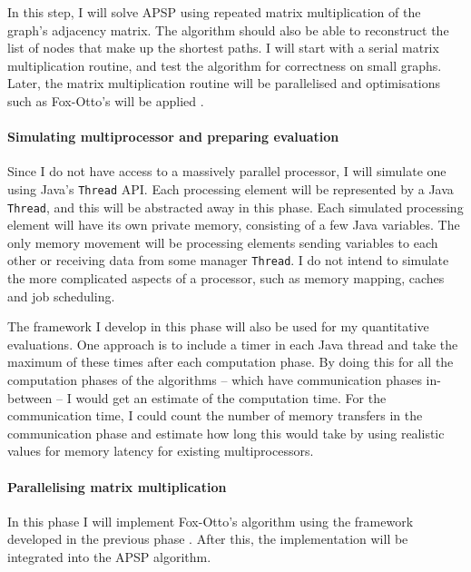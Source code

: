 \documentclass{article}
\begin{document}
In this step, I will solve APSP using repeated matrix multiplication of the
graph's adjacency matrix.  The algorithm should also be able to reconstruct the
list of nodes that make up the shortest paths. I will start with a serial
matrix multiplication routine, and test the algorithm for correctness on small
graphs. Later, the matrix multiplication routine will be parallelised and optimisations
such as Fox-Otto's will be applied \cite{fox}.

\paragraph{Simulating multiprocessor and preparing evaluation}%
\label{par:Simulating Multiprocessor}

Since I do not have access to a massively parallel processor, I will simulate
one using Java's \texttt{Thread} API.  Each processing element will be
represented by a Java \texttt{Thread}, and this will be abstracted away in this
phase. Each simulated processing element will have its own private memory,
consisting of a few Java variables. The only memory movement will be processing
elements sending variables to each other or receiving data from some manager
\texttt{Thread}. I do not intend to simulate the more complicated aspects of
a processor, such as memory mapping, caches and job scheduling.

The framework I develop in this phase will also be used for my quantitative
evaluations.  One approach is to include a timer in each Java thread and take
the maximum of these times after each computation phase. By doing this for all
the computation phases of the algorithms -- which have communication phases
in-between -- I would get an estimate of the computation time. For the
communication time, I could count the number of memory transfers in the
communication phase and estimate how long this would take by using realistic
values for memory latency for existing multiprocessors.

\paragraph{Parallelising matrix multiplication}%
\label{par:Parallelising Matrix Multiplication}

In this phase I will implement Fox-Otto's algorithm using the framework
developed in the previous phase \cite{fox}. After this, the
implementation will be integrated into the APSP algorithm.

\end{document}
